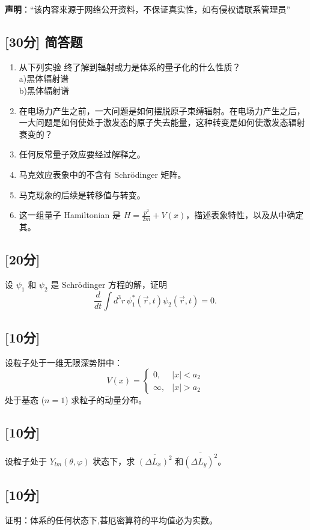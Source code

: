
\textbf{声明}：“该内容来源于网络公开资料，不保证真实性，如有侵权请联系管理员”

\subsection{[30分] 简答题}
 \begin{enumerate}
        \item 从下列实验 终了解到辐射或力是体系的量子化的什么性质？\\
        a)黑体辐射谱\\b)黑体辐射谱
        \item 在电场力产生之前，一大问题是如何摆脱原子束缚辐射。在电场力产生之后，一大问题是如何使处于激发态的原子失去能量，这种转变是如何使激发态辐射衰变的？
        \item 任何反常量子效应要经过解释之。
        \item 马克效应表象中的不含有 Schrödinger 矩阵。
        \item 马克现象的后续是转移值与转变。
        \item 这一组量子 Hamiltonian 是 $H = \frac{p^2}{2m} + V(x)$，描述表象特性，以及从中确定其。
    \end{enumerate}

\subsection{[20分]}
设 $\psi_1$ 和 $\psi_2$ 是 Schrödinger 方程的解，证明
\[
\frac{d}{dt} \int d^3r \, \psi_1^* (\vec{r}, t) \psi_2 (\vec{r}, t) = 0.~
\]

\subsection{[10分]}
设粒子处于一维无限深势阱中：
\[
V(x) =
\begin{cases}
0, & |x| < a_2 \\
\infty, & |x| > a_2
\end{cases}~
\]
处于基态 ($n=1$) 求粒子的动量分布。

\subsection{[10分]}
设粒子处于 $Y_{lm}(\theta, \varphi)$ 状态下，求 $\overline{(\Delta L_x)^2}$ 和$\overline{(\Delta L_y)^2}$。

\subsection{[10分]}
证明：体系的任何状态下,甚厄密算符的平均值必为实数。

